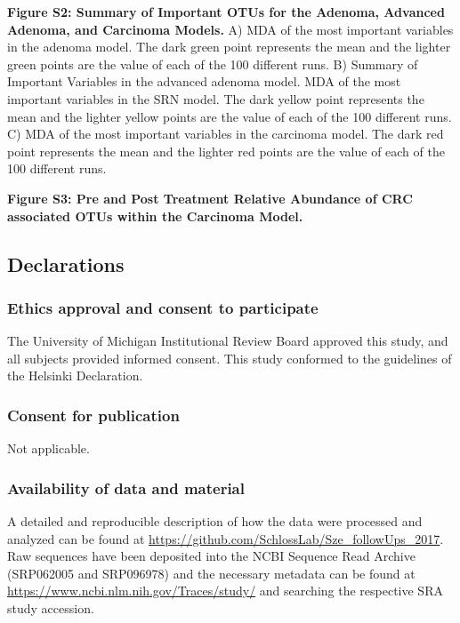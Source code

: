 \documentclass[12pt,]{article}
\begin{document}
\textbf{Figure S2: Summary of Important OTUs for the Adenoma, Advanced
Adenoma, and Carcinoma Models.} A) MDA of the most important variables
in the adenoma model. The dark green point represents the mean and the
lighter green points are the value of each of the 100 different runs. B)
Summary of Important Variables in the advanced adenoma model. MDA of the
most important variables in the SRN model. The dark yellow point
represents the mean and the lighter yellow points are the value of each
of the 100 different runs. C) MDA of the most important variables in the
carcinoma model. The dark red point represents the mean and the lighter
red points are the value of each of the 100 different runs.

\textbf{Figure S3: Pre and Post Treatment Relative Abundance of CRC
associated OTUs within the Carcinoma Model.}

\newpage

\subsection{Declarations}\label{declarations}

\subsubsection{Ethics approval and consent to
participate}\label{ethics-approval-and-consent-to-participate}

The University of Michigan Institutional Review Board approved this
study, and all subjects provided informed consent. This study conformed
to the guidelines of the Helsinki Declaration.

\subsubsection{Consent for publication}\label{consent-for-publication}

Not applicable.

\subsubsection{Availability of data and
material}\label{availability-of-data-and-material}

A detailed and reproducible description of how the data were processed
and analyzed can be found at
\url{https://github.com/SchlossLab/Sze_followUps_2017}. Raw sequences
have been deposited into the NCBI Sequence Read Archive (SRP062005 and
SRP096978) and the necessary metadata can be found at
\url{https://www.ncbi.nlm.nih.gov/Traces/study/} and searching the
respective SRA study accession.
\end{document}
